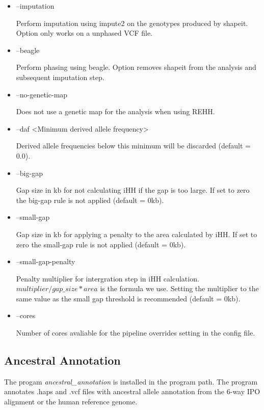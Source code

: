\documentclass[a4paper,10pt]{article}
\begin{document}
\begin{itemize}
\item --imputation

Perform imputation using impute2 on the genotypes produced by shapeit. Option only works on a unphased VCF file.

\item --beagle

Perform phasing using beagle. Option removes shapeit from the analysis and subsequent imputation step.

\item --no-genetic-map 

Does not use a genetic map for the analysis when using REHH.

\item --daf <Minimum derived allele frequency>

Derived allele frequencies below this minimum will be discarded (default = 0.0).

\item --big-gap

Gap size in kb for not calculating iHH if the gap is too large. If set
to zero the big-gap rule is not applied (default = 0kb).

\item --small-gap

Gap size in kb for applying a penalty to the area calculated by
iHH. If set to zero the small-gap rule is not applied (default = 0kb).

\item --small-gap-penalty

Penalty multiplier for intergration step in iHH
calculation. $multiplier/gap\_size * area$ is the formula we
use. Setting the multiplier to the same value as the small gap
threshold is recommended (default = 0kb).

\item --cores 

Number of cores avaliable for the pipeline overrides setting in the config file. 

\end{itemize}
\subsection{Ancestral Annotation}
The progam \emph{ancestral\_annotation} is installed in the program
path. The program annotates .haps and .vcf files with ancestral allele
annotation from the 6-way IPO alignment or the human reference genome.
\end{document}
